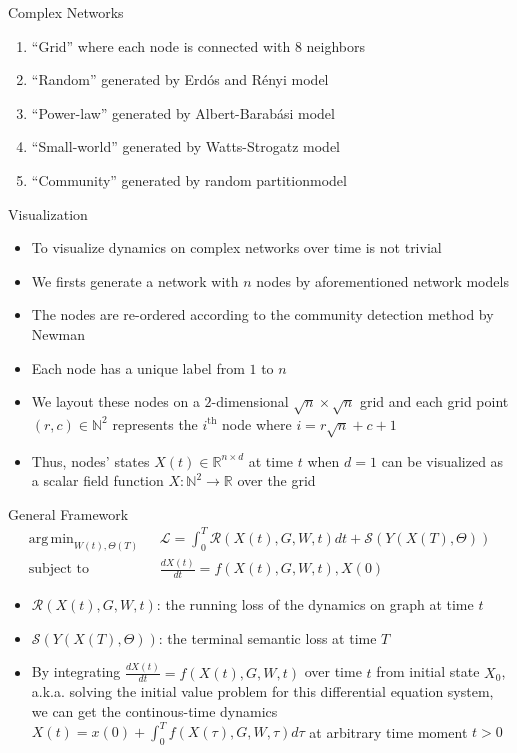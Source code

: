 \documentclass{beamer}
\DeclareMathOperator*{\argmin}{arg\,min}
\begin{document}
\begin{frame}{Complex Networks}
\begin{enumerate}
\item ``Grid'' where each node is connected with 8 neighbors
\item ``Random'' generated by Erd\'os and R\'enyi model
\item ``Power-law'' generated by Albert-Barab\'asi model
\item ``Small-world'' generated by Watts-Strogatz model
\item ``Community'' generated by random partitionmodel
\end{enumerate}
\end{frame}

\begin{frame}{Visualization}
\begin{itemize}
\item To visualize dynamics on complex networks over time is not trivial
\item We firsts generate a network with $n$ nodes by aforementioned network models
\item The nodes are re-ordered according to the community detection method by Newman
\item Each node has a unique label from $1$ to $n$
\item We layout these nodes on a $2$-dimensional $\sqrt{n}\times\sqrt{n}$ grid and each grid point $(r,c)\in\mathbb{N}^2$ represents the $i^\text{th}$ node where $i=r\sqrt{n}+c+1$
\item Thus, nodes' states $X(t)\in\mathbb{R}^{n\times d}$ at time $t$ when $d=1$ can be visualized as a scalar field function $X:\mathbb{N}^2\to\mathbb{R}$ over the grid
\end{itemize}
\end{frame}

\begin{frame}{General Framework}
\[
\begin{split}
\argmin_{W(t),\Theta(T)}\text{ }&\mathcal{L}=\int_0^T\mathcal{R}\left(X(t),G,W,t\right)dt+\mathcal{S}\left(Y(X(T),\Theta)\right)\\
\text{subject to }&\frac{dX(t)}{dt}=f(X(t),G,W,t),X(0)
\end{split}
\]
\begin{itemize}
\item $\mathcal{R}(X(t),G,W,t)$: the running loss of the dynamics on graph at time $t$
\item $\mathcal{S}(Y(X(T),\Theta))$: the terminal semantic loss at time $T$
\item By integrating $\frac{dX(t)}{dt}=f(X(t),G,W,t)$ over time $t$ from initial state $X_0$, a.k.a. solving the initial value problem for this differential equation system, we can get the continous-time dynamics $X(t)=x(0)+\int_0^Tf(X(\tau),G,W,\tau)d\tau$ at arbitrary time moment $t>0$
\end{itemize}
\end{frame}
\end{document}
